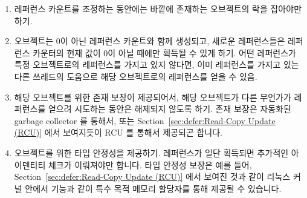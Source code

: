 \begin{enumerate}
\item	레퍼런스 카운트를 조정하는 동안에는 바깥에 존재하는 오브젝트의 락을
	잡아야만 하기.
\item	오브젝트는 0이 아닌 레퍼런스 카운트와 함께 생성되고, 새로운
	레퍼런스들은 레퍼런스 카운터의 현재 값이 0이 아닐 때에만 획득될 수 있게
		하기.
	어떤 레퍼런스가 특정 오브젝트로의 레퍼런스를 가지고 있지 않다면, 이미
		레퍼런스를 가지고 있는 다른 쓰레드의 도움으로 해당 오브젝트로의
		레퍼런스를 얻을 수 있음.
\item	해당 오브젝트를 위한 존재 보장이 제공되어서, 해당 오브젝트가 다른
	무언가가 레퍼런스를 얻으려 시도하는 동안은 해제되지 않도록 하기.
	존재 보장은 자동화된 garbage collector 를 통해서, 또는
	Section~\ref{sec:defer:Read-Copy Update (RCU)} 에서 보여지듯이 RCU 를
	통해서 제공되곤 합니다.
\item	오브젝트를 위한 타입 안정성을 제공하기.
	레퍼런스가 일단 획득되면 추가적인 아이덴티티 체크가 이뤄져야만 합니다.
	타입 안정성 보장은 예를 들어,
	Section~\ref{sec:defer:Read-Copy Update (RCU)} 에서 보여진 것과 같이
	리눅스 커널 안에서  기능과 같이 특수 목적
	메모리 할당자를 통해 제공될 수 있습니다.
\iffalse

\item	A lock residing outside of the object must be held while
	manipulating the reference count.
\item	The object is created with a non-zero reference count, and new
	references may be acquired only when the current value of
	the reference counter is non-zero.
	If a thread does not have a reference to a given object,
	it may obtain one with the help of another thread that
	already has a reference.
\item	An existence guarantee is provided for the object, preventing
	it from being freed while some other
	entity might be attempting to acquire a reference.
	Existence guarantees are often provided by automatic
	garbage collectors, and, as will be seen in
	Section~\ref{sec:defer:Read-Copy Update (RCU)}, by RCU.
\item	A type-safety guarantee is provided for the object.
	An additional identity check must be performed once
	the reference is acquired.
	Type-safety guarantees can be provided by special-purpose
	memory allocators, for example, by the
	\co{SLAB_DESTROY_BY_RCU} feature within the Linux kernel,
	as will be seen in Section~\ref{sec:defer:Read-Copy Update (RCU)}.
\fi
\end{enumerate}

